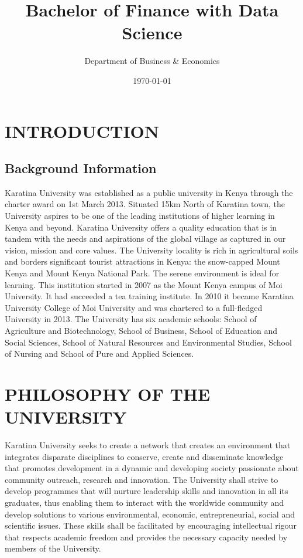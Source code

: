 \documentclass[16,a4paperpaper,]{article}
\title{Bachelor of Finance with Data Science}
\author{Department of Business \& Economics}
\date{\today}
\begin{document}
\renewcommand{\contentsname}{Contents}

\renewcommand{\pagename}{Page}


\maketitle
\tableofcontents
{}
\clearpage

\section{INTRODUCTION}

\subsection{Background Information}

Karatina University was established as a public university in Kenya
through the charter award on 1st March 2013. Situated 15km North of
Karatina town, the University aspires to be one of the leading
institutions of higher learning in Kenya and beyond. Karatina University
offers a quality education that is in tandem with the needs and
aspirations of the global village as captured in our vision, mission and
core values. The University locality is rich in agricultural soils and
borders significant tourist attractions in Kenya: the snow-capped Mount
Kenya and Mount Kenya National Park. The serene environment is ideal for
learning. This institution started in 2007 as the Mount Kenya campus of
Moi University. It had succeeded a tea training institute. In 2010 it
became Karatina University College of Moi University and was chartered
to a full-fledged University in 2013. The University has six academic
schools: School of Agriculture and Biotechnology, School of Business,
School of Education and Social Sciences, School of Natural Resources and
Environmental Studies, School of Nursing and School of Pure and Applied
Sciences.

\section{PHILOSOPHY OF THE UNIVERSITY}

Karatina University seeks to create a network that creates an
environment that integrates disparate disciplines to conserve, create
and disseminate knowledge that promotes development in a dynamic and
developing society passionate about community outreach, research and
innovation. The University shall strive to develop programmes that will
nurture leadership skills and innovation in all its graduates, thus
enabling them to interact with the worldwide community and develop
solutions to various environmental, economic, entrepreneurial, social
and scientific issues. These skills shall be facilitated by encouraging
intellectual rigour that respects academic freedom and provides the
necessary capacity needed by members of the University.
\end{document}
